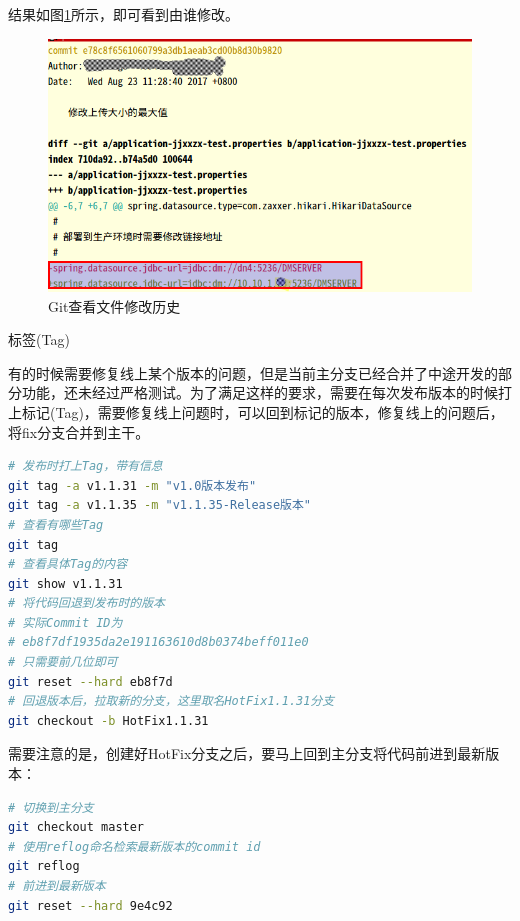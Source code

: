 \documentclass[12pt]{book}
\makeatletter
\numberwithin{dummy}{section}
\theoremstyle{ocrenumbox}
\theoremstyle{blacknumex}
\theoremstyle{blacknumbox}
\theoremstyle{ocrenum}
\renewcommand{\subsection}{\@startsection {subsection}{2}{\z@}
	{-3ex \@plus -0.1ex \@minus -.4ex}
	{0.5ex \@plus.2ex }
	{\normalfont\sffamily\bfseries}}
\makeatother
\begin{document}
结果如图\ref{fig:filemodifyhistory}所示，即可看到由谁修改。

\begin{figure}[htbp]
	\centering
	\includegraphics[scale=0.4]{filemodifyhistory.png}
	\caption{Git查看文件修改历史}
	\label{fig:filemodifyhistory}
\end{figure}

\subsection{标签(Tag)}

有的时候需要修复线上某个版本的问题，但是当前主分支已经合并了中途开发的部分功能，还未经过严格测试。为了满足这样的要求，需要在每次发布版本的时候打上标记(Tag)，需要修复线上问题时，可以回到标记的版本，修复线上的问题后，将fix分支合并到主干。

\begin{lstlisting}[language=Bash]
# 发布时打上Tag，带有信息
git tag -a v1.1.31 -m "v1.0版本发布"
git tag -a v1.1.35 -m "v1.1.35-Release版本"
# 查看有哪些Tag
git tag
# 查看具体Tag的内容
git show v1.1.31
# 将代码回退到发布时的版本
# 实际Commit ID为
# eb8f7df1935da2e191163610d8b0374beff011e0
# 只需要前几位即可
git reset --hard eb8f7d
# 回退版本后，拉取新的分支，这里取名HotFix1.1.31分支
git checkout -b HotFix1.1.31
\end{lstlisting}

需要注意的是，创建好HotFix分支之后，要马上回到主分支将代码前进到最新版本：

\begin{lstlisting}[language=Bash]
# 切换到主分支
git checkout master
# 使用reflog命名检索最新版本的commit id
git reflog
# 前进到最新版本
git reset --hard 9e4c92
\end{lstlisting}
\end{document}
